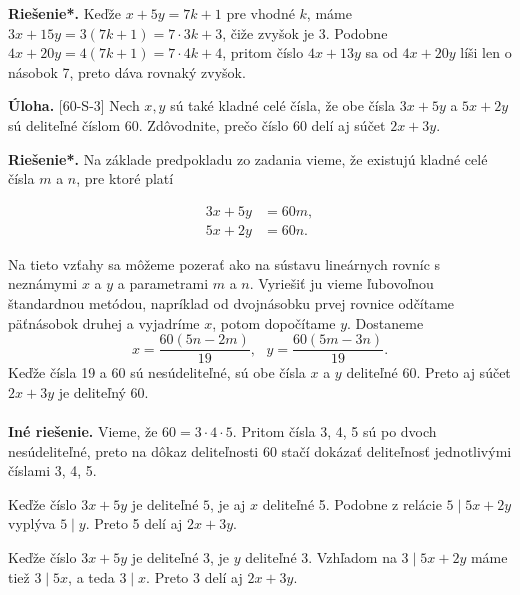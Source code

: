 \documentclass[11pt,a4paper,oneside,final]{book}
\newcommand{\ul}{\textbf{Úloha.} }
\newcommand{\rieh}{\textbf{Riešenie*.} }
\begin{document}
\rieh Keďže $x + 5y = 7k + 1$ pre vhodné $k$, máme $3x + 15y = 3(7k + 1) = 7 \cdot 3k + 3$, čiže zvyšok je 3. Podobne $4x + 20y = 4(7k + 1) = 7 \cdot 4k + 4$, pritom číslo $4x + 13y$ sa od $4x + 20y$ líši len o násobok 7, preto dáva rovnaký zvyšok.\\
\begin{tcolorbox}[breakable,notitle,boxrule=0pt,colback=light-gray,colframe=light-gray]\ul [60-S-3] Nech $x, y$ sú také kladné celé čísla, že obe čísla $3x + 5y$ a $5x + 2y$ sú deliteľné číslom 60. Zdôvodnite, prečo číslo 60 delí aj súčet $2x + 3y$.

\end{tcolorbox}

\rieh Na základe predpokladu zo zadania vieme, že existujú kladné celé čísla $m$ a $n$, pre ktoré platí
\vspace{-25pt}
\begin{center}
\begin{align*}
3x + 5y &= 60m,\\
5x + 2y &= 60n.
\end{align*}
\end{center}
Na tieto vzťahy sa môžeme pozerať ako na sústavu lineárnych rovníc s neznámymi $x$ a $y$ a parametrami $m$ a $n$. Vyriešiť ju vieme ľubovoľnou štandardnou metódou, napríklad od dvojnásobku prvej rovnice odčítame päťnásobok druhej a vyjadríme $x$, potom dopočítame $y$. Dostaneme
$$x = \frac{60(5n - 2m)}{19}, \ \ \ y =\frac{60(5m - 3n)}{19}.$$
Keďže čísla 19 a 60 sú nesúdeliteľné, sú obe čísla $x$ a $y$ deliteľné 60. Preto aj súčet $2x + 3y$ je deliteľný 60.\\
\\
\textbf{Iné riešenie.} Vieme, že $60 = 3 \cdot 4 \cdot 5$. Pritom čísla 3, 4, 5 sú po dvoch nesúdeliteľné, preto na dôkaz deliteľnosti 60 stačí dokázať deliteľnosť jednotlivými číslami 3, 4, 5.

Keďže číslo $3x + 5y$ je deliteľné $5$, je aj $x$ deliteľné 5. Podobne z relácie $5 \mid 5x + 2y$ vyplýva $5 \mid y$. Preto 5 delí aj $2x + 3y$.

Keďže číslo $3x + 5y$ je deliteľné 3, je $y$ deliteľné 3. Vzhľadom na $3 \mid 5x + 2y$ máme tiež $3 \mid 5x$, a teda $3 \mid x$. Preto 3 delí aj $2x + 3y$.
\end{document}
